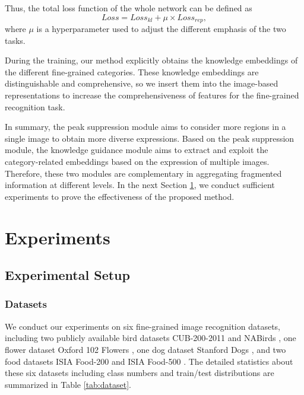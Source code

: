 \documentclass[5p,twocolumn]{elsarticle}
\begin{document}
Thus, the total loss function of the whole network can be defined as
\begin{equation}\label{equ.atteLoss}
Loss = Loss_{kl}+ \mu \times Loss_{rep},
\end{equation} 
where $\mu$ is a hyperparameter used to adjust the different emphasis of the two tasks.  

During the training, our method explicitly obtains the knowledge embeddings of the different fine-grained categories. These knowledge embeddings are distinguishable and comprehensive, so we insert them into the image-based representations to increase the comprehensiveness of features for the fine-grained recognition task.

In summary, the peak suppression module aims to consider more regions in a single image to obtain more diverse expressions. Based on the peak suppression module, the knowledge guidance module aims to extract and exploit the category-related embeddings based on the expression of multiple images. Therefore, these two modules are complementary in aggregating fragmented information at different levels. 
In the next Section \ref{sec.exp}, we conduct sufficient experiments to prove the effectiveness of the proposed method. 

\section{Experiments}\label{sec.exp}
\subsection{Experimental Setup}
\subsubsection{\textbf{Datasets}}
We conduct our experiments on six fine-grained image recognition datasets,
including two publicly available bird datasets CUB-200-2011 \cite{Wah2011Caltech} and NABirds \cite{Horn2015Building}, one flower dataset Oxford 102 Flowers \cite{Nilsback2008Automated}, one dog dataset Stanford Dogs \cite{Khosla2011Novel}, and two food datasets ISIA Food-200 \cite{Min2019Ingredient} and ISIA Food-500 \cite{Min-ISIA-500-MM2020}. The detailed statistics about these six datasets including class numbers and train/test distributions are summarized in Table \ref{tab:dataset}.
\end{document}
